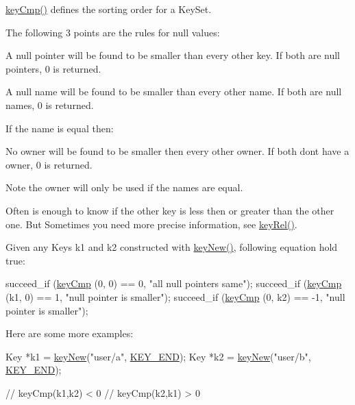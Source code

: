 \hyperlink{group__keytest_gaf6e66e12fe04d535a5d1c8218ced803e}{key\+Cmp()} defines the sorting order for a Key\+Set.

The following 3 points are the rules for null values\+:


\begin{DoxyItemize}
\item A null pointer will be found to be smaller than every other key. If both are null pointers, 0 is returned.
\item A null name will be found to be smaller than every other name. If both are null names, 0 is returned.
\end{DoxyItemize}

If the name is equal then\+:


\begin{DoxyItemize}
\item No owner will be found to be smaller then every other owner. If both don\textquotesingle{}t have a owner, 0 is returned.
\end{DoxyItemize}

\begin{DoxyNote}{Note}
the owner will only be used if the names are equal.
\end{DoxyNote}
Often is enough to know if the other key is less then or greater than the other one. But Sometimes you need more precise information, see \hyperlink{group__keytest_ga6bb0f95ac34ce9c42d61bb35a76139d0}{key\+Rel()}.

Given any Keys k1 and k2 constructed with \hyperlink{group__key_gad23c65b44bf48d773759e1f9a4d43b89}{key\+New()}, following equation hold true\+:


\begin{DoxyCodeInclude}
        succeed\_if (\hyperlink{group__keytest_gaf6e66e12fe04d535a5d1c8218ced803e}{keyCmp} (0, 0) == 0, \textcolor{stringliteral}{"all null pointers same"});
        succeed\_if (\hyperlink{group__keytest_gaf6e66e12fe04d535a5d1c8218ced803e}{keyCmp} (k1, 0) == 1, \textcolor{stringliteral}{"null pointer is smaller"});
        succeed\_if (\hyperlink{group__keytest_gaf6e66e12fe04d535a5d1c8218ced803e}{keyCmp} (0, k2) == -1, \textcolor{stringliteral}{"null pointer is smaller"});
\end{DoxyCodeInclude}
 Here are some more examples\+: 
\begin{DoxyCode}
Key *k1 = \hyperlink{group__key_gad23c65b44bf48d773759e1f9a4d43b89}{keyNew}(\textcolor{stringliteral}{"user/a"}, \hyperlink{group__key_gga91fb3178848bd682000958089abbaf40aa8adb6fcb92dec58fb19410eacfdd403}{KEY\_END});
Key *k2 = \hyperlink{group__key_gad23c65b44bf48d773759e1f9a4d43b89}{keyNew}(\textcolor{stringliteral}{"user/b"}, \hyperlink{group__key_gga91fb3178848bd682000958089abbaf40aa8adb6fcb92dec58fb19410eacfdd403}{KEY\_END});

\textcolor{comment}{// keyCmp(k1,k2) < 0}
\textcolor{comment}{// keyCmp(k2,k1) > 0}
\end{DoxyCode}


